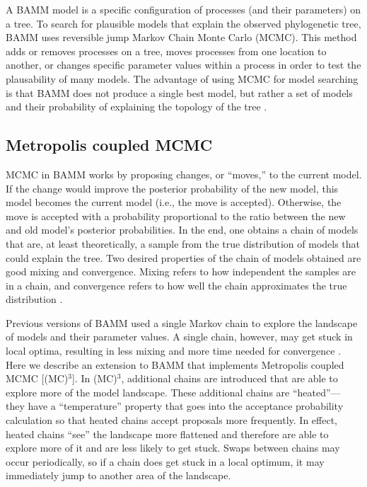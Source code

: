 \documentclass[12pt]{article}
\newcommand{\MCMCMC}{(MC)$^{3}$}
\begin{document}
A BAMM model is a specific configuration of processes
(and their parameters) on a tree.
%
To search for plausible models that explain the observed phylogenetic tree,
BAMM uses reversible jump Markov Chain Monte Carlo (MCMC).
%
This method adds or removes processes on a tree,
moves processes from one location to another,
or changes specific parameter values within a process
in order to test the plausability of many models.
%
The advantage of using MCMC for model searching
is that BAMM does not produce a single best model,
but rather a set of models and their probability
of explaining the topology of the tree \citep{rab14plos}.


\subsection*{Metropolis coupled MCMC}

MCMC in BAMM works by proposing changes, or ``moves,'' to the current model.
%
If the change would improve the posterior probability of the new model,
this model becomes the current model (i.e., the move is accepted).
%
Otherwise, the move is accepted with a probability proportional
to the ratio between the new and old model's posterior probabilities.
%
In the end, one obtains a chain of models that are, at least theoretically,
a sample from the true distribution of models that could explain the tree.
%
Two desired properties of the chain of models obtained
are good mixing and convergence.
%
Mixing refers to how independent the samples are in a chain,
and convergence refers to how well the chain
approximates the true distribution \citep{giv05}.


Previous versions of BAMM used a single Markov chain
to explore the landscape of models and their parameter values.
%
A single chain, however, may get stuck in local optima,
resulting in less mixing and more time needed for convergence \citep{alt04}.
%
Here we describe an extension to BAMM
that implements Metropolis coupled MCMC [\MCMCMC].
%
In \MCMCMC, additional chains are introduced
that are able to explore more of the model landscape.
%
These additional chains are ``heated''---%
they have a ``temperature'' property
that goes into the acceptance probability calculation
so that heated chains accept proposals more frequently.
%
In effect, heated chains ``see'' the landscape
more flattened and therefore are able to explore more of it
and are less likely to get stuck.
%
Swaps between chains may occur periodically,
so if a chain does get stuck in a local optimum,
it may immediately jump to another area of the landscape.
\end{document}

